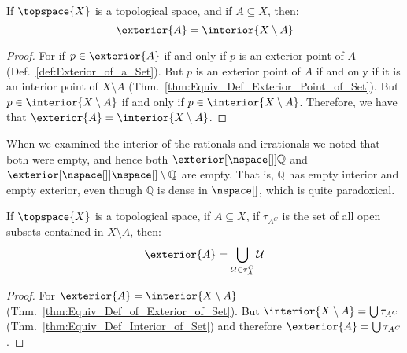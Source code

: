 \documentclass{article}                                                        %
\begin{document}
        \begin{theorem}
            \label{thm:Equiv_Def_of_Exterior_of_Set}%
            If $\topspace{X}$ is a topological space, and if $A\subseteq{X}$,
            then:
            \begin{equation}
                \exterior{A}=\interior{X\setminus{A}}
            \end{equation}
        \end{theorem}
        \begin{proof}
            For if $p\in\exterior{A}$ if and only if $p$ is an exterior point of
            $A$ (Def.~\ref{def:Exterior_of_a_Set}). But $p$ is an exterior point
            of $A$ if and only if it is an interior point of
            $X\setminus{A}$ (Thm.~\ref{thm:Equiv_Def_Exterior_Point_of_Set}).
            But $p\in\interior{X\setminus{A}}$ if and only if
            $p\in\interior{X\setminus{A}}$. Therefore, we have that
            $\exterior{A}=\interior{X\setminus{A}}$.
        \end{proof}
        \begin{example}
            When we examined the interior of the rationals and irrationals we
            noted that both were empty, and hence both
            $\exterior[{\nspace[]}]{\mathbb{Q}}$ and
            $\exterior[{\nspace[]}]{\nspace[]\setminus\mathbb{Q}}$ are empty.
            That is, $\mathbb{Q}$ has empty interior and empty exterior, even
            though $\mathbb{Q}$ is dense in $\nspace[]$, which is quite
            paradoxical.
        \end{example}
        \begin{theorem}
            \label{thm:Alt_Equiv_Def_Exterior_of_Set}%
            If $\topspace{X}$ is a topological space, if $A\subseteq{X}$, if
            $\tau_{A^{C}}$ is the set of all open subsets contained in
            $X\setminus{A}$, then:
            \begin{equation}
                \exterior{A}=\bigcup_{\mathcal{U}\in\tau_{A}^{C}}\mathcal{U}
            \end{equation}
        \end{theorem}
        \begin{proof}
            For $\exterior{A}=\interior{X\setminus{A}}$
            (Thm.~\ref{thm:Equiv_Def_of_Exterior_of_Set}). But
            $\interior{X\setminus{A}}=\bigcup\tau_{A^{C}}$
            (Thm.~\ref{thm:Equiv_Def_Interior_of_Set}) and therefore
            $\exterior{A}=\bigcup\tau_{A^{C}}$.
        \end{proof}
\end{document}
